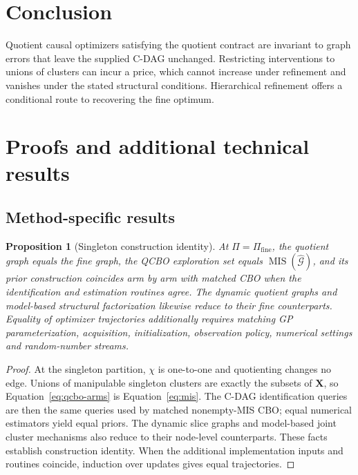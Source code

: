 \documentclass[twoside]{article}
\newtheorem{proposition}{Proposition}
\newcommand{\Gg}{\mathcal{G}}
\begin{document}
\section{Conclusion}
\label{sec:conclusion}

Quotient causal optimizers satisfying the quotient contract are invariant to graph errors that leave the supplied C-DAG unchanged. Restricting interventions to unions of clusters can incur a price, which cannot increase under refinement and vanishes under the stated structural conditions. Hierarchical refinement offers a conditional route to recovering the fine optimum.




\appendix
\onecolumn
\raggedbottom

\section{Proofs and additional technical results}
\label{app:proofs}

\subsection{Method-specific results}

\begin{proposition}[Singleton construction identity]
\label{prop:identity}
At \(\Pi=\Pi_{\mathrm{fine}}\), the quotient graph equals the fine graph, the QCBO exploration set equals \(\operatorname{MIS}(\widehat{\Gg})\), and its prior construction coincides arm by arm with matched CBO when the identification and estimation routines agree. The dynamic quotient graphs and model-based structural factorization likewise reduce to their fine counterparts. Equality of optimizer trajectories additionally requires matching GP parameterization, acquisition, initialization, observation policy, numerical settings and random-number streams.
\end{proposition}

\begin{proof}
    At the singleton partition, \(\chi\) is one-to-one and quotienting changes no edge. Unions of manipulable singleton clusters are exactly the subsets of \(\mathbf X\), so Equation~\eqref{eq:qcbo-arms} is Equation~\eqref{eq:mis}. The C-DAG identification queries are then the same queries used by matched nonempty-MIS CBO; equal numerical estimators yield equal priors. The dynamic slice graphs and model-based joint cluster mechanisms also reduce to their node-level counterparts. These facts establish construction identity. When the additional implementation inputs and routines coincide, induction over updates gives equal trajectories.
\end{proof}
\end{document}

